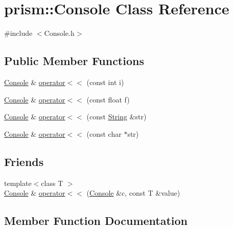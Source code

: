\hypertarget{classprism_1_1_console}{}\section{prism\+:\+:Console Class Reference}
\label{classprism_1_1_console}


{\ttfamily \#include $<$Console.\+h$>$}

\subsection*{Public Member Functions}
\begin{DoxyCompactItemize}
\item 
\hyperlink{classprism_1_1_console}{Console} \& \hyperlink{classprism_1_1_console_a3eb511ba3ea22adb02c587f111bd350d}{operator$<$$<$} (const int i)
\item 
\hyperlink{classprism_1_1_console}{Console} \& \hyperlink{classprism_1_1_console_af957f2811b1197c8556c84c1bab81844}{operator$<$$<$} (const float f)
\item 
\hyperlink{classprism_1_1_console}{Console} \& \hyperlink{classprism_1_1_console_a112839a0c9e5700622044f9acfa71b55}{operator$<$$<$} (const \hyperlink{classprism_1_1_string}{String} \&str)
\item 
\hyperlink{classprism_1_1_console}{Console} \& \hyperlink{classprism_1_1_console_a10330f67cc56044e56fa22e13f2ea341}{operator$<$$<$} (const char $\ast$str)
\end{DoxyCompactItemize}
\subsection*{Friends}
\begin{DoxyCompactItemize}
\item 
{\footnotesize template$<$class T $>$ }\\\hyperlink{classprism_1_1_console}{Console} \& \hyperlink{classprism_1_1_console_a479b9fc4c8896e2ff901dbb789a14136}{operator$<$$<$} (\hyperlink{classprism_1_1_console}{Console} \&c, const T \&value)
\end{DoxyCompactItemize}


\subsection{Member Function Documentation}
